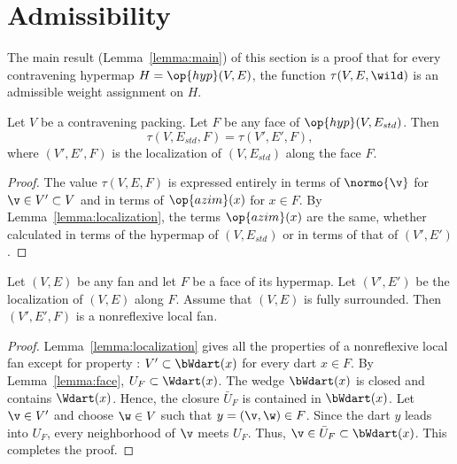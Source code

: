 \section{Admissibility}




The main result (Lemma~\ref{lemma:main}) of this section is a proof
that for every contravening hypermap $H=\op{hyp}(V,E)$, the function
$\tau(V,E,\wild)$ is an admissible weight assignment on $H$.



\begin{lemma}[]\cutrate{}  \label{lemma:tau-local}
  Let $V$ be a contravening packing.
  Let $F$ be any face of $\op{hyp}(V,E_{std})$.  Then
\[ 
\tau(V,E_{std},F) = \tau(V',E',F),
\] 
where $(V',E',F)$ is the localization of $(V,E_{std})$ along the face $F$.
\end{lemma}

\begin{proof} The value $\tau(V,E,F)$ is expressed entirely in terms
  of $\normo{\v}$ for $\v\in V'\subset V$ and in terms of
  $\op{azim}(x)$ for $x\in F$.  By Lemma~\ref{lemma:localization},
  the terms $\op{azim}(x)$ are the same, whether calculated in terms
  of the hypermap of $(V,E_{std})$ or in terms of that of $(V',E')$.
\end{proof}


\begin{lemma}[]\cutrate{} Let $(V,E)$ be any fan and
  let $F$ be a face of its hypermap.  Let $(V',E')$ be the
  localization of $(V,E)$ along $F$.  Assume that $(V,E)$ is fully surrounded.
  Then $(V',E',F)$ is a nonreflexive local fan.
\end{lemma}

\begin{proof}
  Lemma~\ref{lemma:localization} gives all the properties of a nonreflexive local fan except for property : $V'\subset \bWdart(x)$ for
  every dart $x\in F$.  By Lemma~\ref{lemma:face}, $U_F \subset
  \Wdart(x)$.  The wedge $\bWdart(x)$ is closed and contains
  $\Wdart(x)$. Hence, the closure $\bar U_F$ is contained in
  $\bWdart(x)$.  Let $\v\in V'$ and choose $\w\in V$ such that
  $y=(\v,\w)\in F$.
  Since the dart $y$ leads into $U_F$, every neighborhood of $\v$
  meets $U_F$.  Thus, $\v\in \bar U_F\subset \bWdart(x)$.  This
  completes the proof.
\end{proof}








